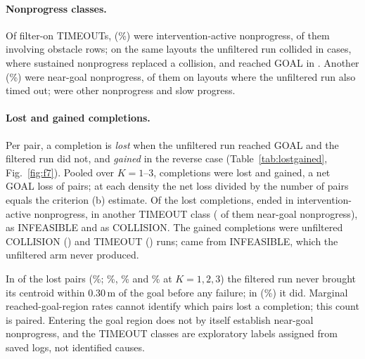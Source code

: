 \documentclass[11pt]{article}
\begin{document}
\paragraph{Nonprogress classes.} Of \TOonTotal{} filter-on TIMEOUTs, \TOfi{} (\TOfiPct\%) were
intervention-active nonprogress, \TOfiObst{} of them involving obstacle rows; on the same layouts the
unfiltered run collided in \TOfiOffColl{} cases, where sustained nonprogress replaced a collision, and
reached GOAL in \TOfiOffGoal. Another \TOng{} (\TOngPct\%) were near-goal nonprogress, \TOngOffTO{} of
them on layouts where the unfiltered run also timed out; \TOother{} were other nonprogress and \TOslow{}
slow progress.

\paragraph{Lost and gained completions.} Per pair, a completion is \emph{lost} when the unfiltered run
reached GOAL and the filtered run did not, and \emph{gained} in the reverse case
(Table~\ref{tab:lostgained}, Fig.~\ref{fig:f7}). Pooled over $K=1$--3, \LostTotalAll{}
completions were lost and \GainTotalAll{} gained, a net GOAL loss of \NetLossAll{} pairs; at each
density the net loss divided by the number of pairs equals the criterion (b) estimate. Of the lost
completions, \LostFIAll{} ended in intervention-active nonprogress, \LostOtherTOAll{} in another TIMEOUT class
(\LostNgAll{} of them near-goal nonprogress), \LostInfAll{} as INFEASIBLE and \LostCollAll{} as
COLLISION. The gained completions were unfiltered COLLISION (\GainCollAll) and TIMEOUT (\GainTOAll)
runs; \GainInfAll{} came from INFEASIBLE, which the unfiltered arm never produced.

In \LostRgrNoAll{} of the \LostTotalAll{} lost pairs (\LostRgrNoPctAll\%; \LostRgrNoPctone\%,
\LostRgrNoPcttwo\% and \LostRgrNoPctthree\% at $K=1,2,3$) the filtered run never brought its
centroid within 0.30\,m of the goal before any failure; in \LostRgrYesAll{} (\LostRgrYesPctAll\%) it
did. Marginal reached-goal-region rates cannot identify which pairs lost a completion; this count is
paired. Entering the goal region does not by itself establish near-goal nonprogress,
and the TIMEOUT classes are exploratory labels assigned from saved logs, not identified causes.
\end{document}
